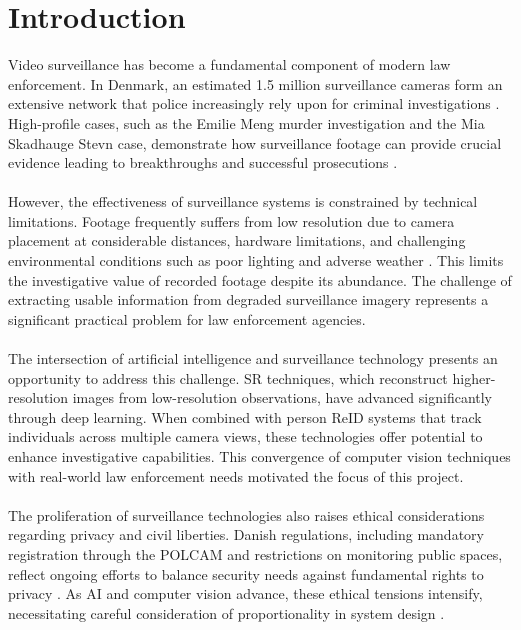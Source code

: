 \chapter{Introduction}
\label{cha:introduction}

Video surveillance has become a fundamental component of modern law enforcement. In Denmark, an estimated 1.5 million surveillance cameras form an extensive network that police increasingly rely upon for criminal investigations \cite{overvagningsekspert2025}. High-profile cases, such as the Emilie Meng murder investigation and the Mia Skadhauge Stevn case, demonstrate how surveillance footage can provide crucial evidence leading to breakthroughs and successful prosecutions \cite{emilie_meng_avisen, mia_stevn_avisen}.
\\\\
However, the effectiveness of surveillance systems is constrained by technical limitations. Footage frequently suffers from low resolution due to camera placement at considerable distances, hardware limitations, and challenging environmental conditions such as poor lighting and adverse weather \cite{arxiv_suerres2021}. This limits the investigative value of recorded footage despite its abundance. The challenge of extracting usable information from degraded surveillance imagery represents a significant practical problem for law enforcement agencies.
\\\\
The intersection of artificial intelligence and surveillance technology presents an opportunity to address this challenge. \ac{SR} techniques, which reconstruct higher-resolution images from low-resolution observations, have advanced significantly through deep learning. When combined with person \ac{ReID} systems that track individuals across multiple camera views, these technologies offer potential to enhance investigative capabilities. This convergence of computer vision techniques with real-world law enforcement needs motivated the focus of this project.
\\\\
The proliferation of surveillance technologies also raises ethical considerations regarding privacy and civil liberties. Danish regulations, including mandatory registration through the \ac{POLCAM} and restrictions on monitoring public spaces, reflect ongoing efforts to balance security needs against fundamental rights to privacy \cite{politiet2024registrer, lov_tv_overvaagning2023}. As \ac{AI} and computer vision advance, these ethical tensions intensify, necessitating careful consideration of proportionality in system design \cite{overvagningsekspert2025, menneskeret_overvaagning}.
